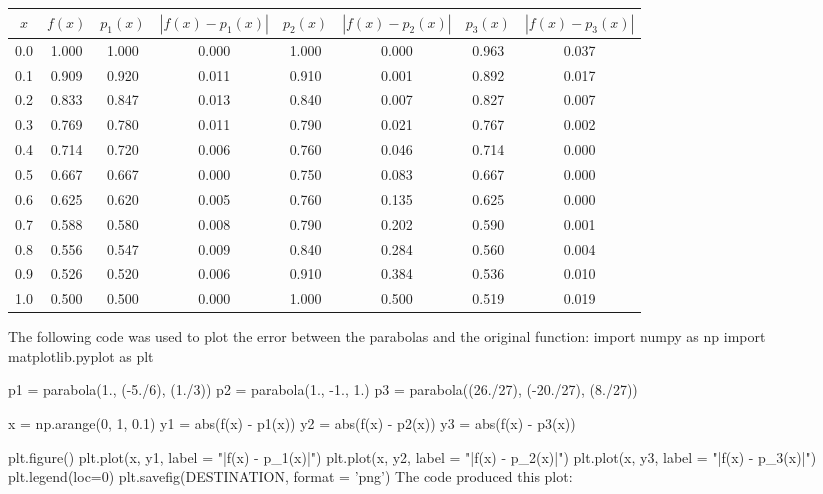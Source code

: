 \documentclass[12pt]{article}
\newenvironment{qv}
{\quote\Verbatim}
{\endVerbatim\endquote}
\begin{document}
\begin{table}[H]
\centering
    \begin{tabular}{|c|c||c|c|c|c|c|c|}
    $x$ & $f(x)$ & $p_1(x)$ & $|f(x) - p_1(x)|$ & $p_2(x)$ & $|f(x) - p_2(x)|$ & $p_3(x)$ & $|f(x) - p_3(x)|$ \\ \hline\hline
    0.0 & 1.000 & 1.000 & 0.000 & 1.000 & 0.000 & 0.963 & 0.037 \\ \hline
    0.1 & 0.909 & 0.920 & 0.011 & 0.910 & 0.001 & 0.892 & 0.017 \\ \hline
    0.2 & 0.833 & 0.847 & 0.013 & 0.840 & 0.007 & 0.827 & 0.007 \\ \hline
    0.3 & 0.769 & 0.780 & 0.011 & 0.790 & 0.021 & 0.767 & 0.002 \\ \hline
    0.4 & 0.714 & 0.720 & 0.006 & 0.760 & 0.046 & 0.714 & 0.000 \\ \hline
    0.5 & 0.667 & 0.667 & 0.000 & 0.750 & 0.083 & 0.667 & 0.000 \\ \hline
    0.6 & 0.625 & 0.620 & 0.005 & 0.760 & 0.135 & 0.625 & 0.000 \\ \hline
    0.7 & 0.588 & 0.580 & 0.008 & 0.790 & 0.202 & 0.590 & 0.001 \\ \hline
    0.8 & 0.556 & 0.547 & 0.009 & 0.840 & 0.284 & 0.560 & 0.004 \\ \hline
    0.9 & 0.526 & 0.520 & 0.006 & 0.910 & 0.384 & 0.536 & 0.010 \\ \hline
    1.0 & 0.500 & 0.500 & 0.000 & 1.000 & 0.500 & 0.519 & 0.019 \\ \hline
    \end{tabular}
\end{table}
\noindent The following code was used to plot the error between the parabolas and the original function:
\begin{qv}
import numpy as np
import matplotlib.pyplot as plt

p1 = parabola(1., (-5./6), (1./3))
p2 = parabola(1., -1., 1.)
p3 = parabola((26./27), (-20./27), (8./27))

x = np.arange(0, 1, 0.1)
y1 = abs(f(x) - p1(x))
y2 = abs(f(x) - p2(x))
y3 = abs(f(x) - p3(x))

plt.figure()
plt.plot(x, y1, label = "|f(x) - p_1(x)|")
plt.plot(x, y2, label = "|f(x) - p_2(x)|")
plt.plot(x, y3, label = "|f(x) - p_3(x)|")
plt.legend(loc=0)
plt.savefig(DESTINATION, format = 'png')
\end{qv}
The code produced this plot:
\end{document}
